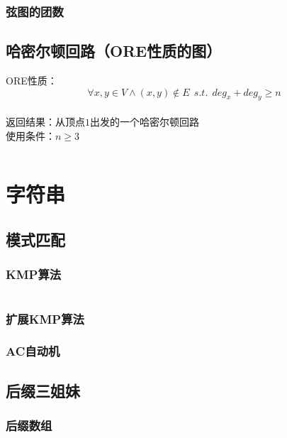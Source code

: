 \documentclass[a4paper]{article}
\newcommand{\cppcode}[1]{
    \inputminted[mathescape]{cpp}{source/#1}
}
\begin{document}
\subsubsection{弦图的团数}

\subsection{哈密尔顿回路（ORE性质的图）}

ORE性质：$$\forall x,y \in V \wedge (x,y) \notin E \ \ s.t. \ \ deg_x+deg_y \geq n$$\\
\indent 返回结果：从顶点$1$出发的一个哈密尔顿回路\\
\indent 使用条件：$n \geq 3$

\cppcode{graph-theory/hamiltonian-circuit-ore.cpp}

\section{字符串}

\subsection{模式匹配}

\subsubsection{KMP算法}

\cppcode{string-manipulation/knuth-morris-pratt.cpp}

\subsubsection{扩展KMP算法}

\subsubsection{AC自动机}


\subsection{后缀三姐妹}

\subsubsection{后缀数组}
\end{document}
